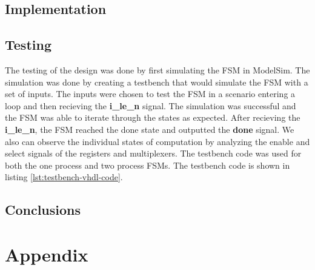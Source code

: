 \documentclass{article}
\begin{document}
\subsection*{Implementation}

\subsection*{Testing}
The testing of the design was done by first simulating the FSM in ModelSim. The simulation was done by creating a testbench that would simulate the FSM with a set of inputs. The inputs were chosen to test the FSM in a scenario entering a loop and then recieving the \textbf{i\_le\_n} signal. The simulation was successful and the FSM was able to iterate through the states as expected. After recieving the \textbf{i\_le\_n}, the FSM reached the done state and outputted the \textbf{done} signal. We also can observe the individual states of computation by analyzing the enable and select signals of the registers and multiplexers. The testbench code was used for both the one process and two process FSMs. The testbench code is shown in listing \ref{lst:testbench-vhdl-code}. 

\subsection*{Conclusions}

\section*{Appendix}
\end{document}
